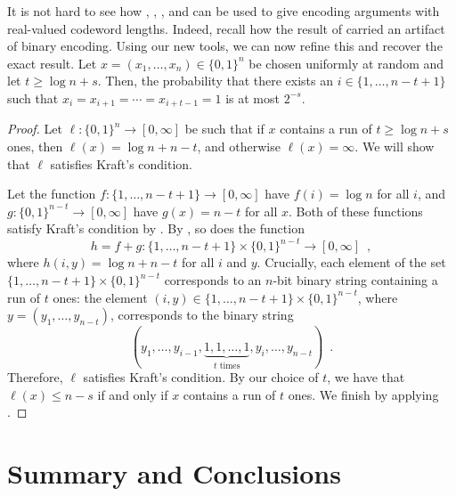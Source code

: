 \documentclass{patmorin}
\newenvironment{customthm}[1]
  {\renewcommand\theinnercustomthm{#1}\innercustomthm}
  {\endinnercustomthm}
\begin{document}
It is not hard to see how , ,
, and  can be used to
give encoding arguments with real-valued codeword lengths. Indeed,
recall how the result of  carried an artifact of binary
encoding. Using our new tools, we can now refine this and recover the
exact result.
\begin{customthm}{\ref*{thm:runs-i}b}
  Let $x=(x_1,\ldots,x_n)\in\{0,1\}^n$ be chosen uniformly at random
  and let $t \ge \log n + s$. Then, the probability that there exists
  an $i\in\{1,\ldots,n-t+1\}$ such that
  $x_i=x_{i+1}=\cdots=x_{i+t-1}=1$ is at most $2^{-s}$.
\end{customthm}
\begin{proof}
  Let $\ell : \{0, 1\}^n \to [0, \infty]$ be such that if $x$ contains
  a run of $t \geq \log n + s$ ones, then $\ell(x) = \log n + n - t$,
  and otherwise $\ell(x) = \infty$. We will show that $\ell$ satisfies
  Kraft's condition.


  Let the function $f : \{1, \ldots, n - t + 1\} \to [0, \infty]$ have
  $f(i) = \log n$ for all $i$, and
  $g : \{0, 1\}^{n - t} \to [0, \infty]$ have $g(x) = n - t$ for all
  $x$. Both of these functions satisfy Kraft's condition by
  . By , so does
  the function
  \[
    h = f + g : \{1, \ldots, n - t + 1\} \times \{0, 1\}^{n - t} \to
    [0, \infty] \enspace ,
  \]
  where $h(i, y) = \log n + n - t$ for all $i$ and $y$. Crucially,
  each element of the set $\{1, \ldots, n - t + 1\} \times \{0, 1\}^{n
    - t}$ corresponds to an $n$-bit binary string containing a run of
  $t$ ones: the element $(i, y) \in \{1, \ldots, n - t + 1\} \times
  \{0, 1\}^{n - t}$, where $y = (y_1, \ldots, y_{n - t})$, corresponds
  to the binary string
  \[
  (y_1, \dots, y_{i - 1}, \underbrace{1, 1, \dots, 1}_{\text{$t$ times}},
  y_i, \dots, y_{n - t}) \enspace .
  \]
  Therefore, $\ell$ satisfies Kraft's condition. By our choice of
  $t$, we have that $\ell(x) \leq n - s$ if and only if $x$ contains a
  run of $t$ ones. We finish by applying .
\end{proof}

\section{Summary and Conclusions}
\end{document}
